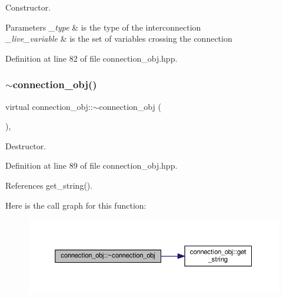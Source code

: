 Constructor. 


\begin{DoxyParams}{Parameters}
{\em \+\_\+type} & is the type of the interconnection \\
\hline
{\em \+\_\+live\+\_\+variable} & is the set of variables crossing the connection \\
\hline
\end{DoxyParams}


Definition at line 82 of file connection\+\_\+obj.\+hpp.

\mbox{\label{classconnection__obj_a044d8d6ac45afa809a74ae788f9fc54b}} 
\subsubsection{\texorpdfstring{$\sim$connection\+\_\+obj()}{~connection\_obj()}}
{\footnotesize\ttfamily virtual connection\+\_\+obj\+::$\sim$connection\+\_\+obj (\begin{DoxyParamCaption}{ }\end{DoxyParamCaption})\hspace{0.3cm}{\ttfamily [inline]}, {\ttfamily [virtual]}}



Destructor. 



Definition at line 89 of file connection\+\_\+obj.\+hpp.



References get\+\_\+string().

Here is the call graph for this function\+:
\nopagebreak
\begin{figure}[H]
\begin{center}
\leavevmode
\includegraphics[width=350pt]{dd/d92/classconnection__obj_a044d8d6ac45afa809a74ae788f9fc54b_cgraph}
\end{center}
\end{figure}


